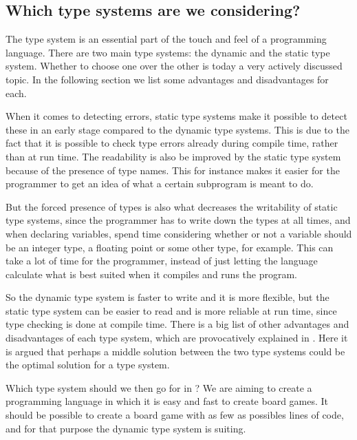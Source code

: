 \subsection{Which type systems are we considering?}
\label{sec:typesystemanalysis}

The type system is an essential part of the touch and feel of a programming
language. There are two main type systems: the dynamic and the static
type system. Whether to choose one over the other is today a very
actively discussed topic. In the following section we list some advantages and
disadvantages for each.

When it comes to detecting errors, static type systems make it possible to
detect these in an early stage compared to the dynamic type systems. This is
due to the fact that it is possible to check type errors already during
compile time, rather than at run time. The readability is also be improved by
the static type system because of the presence of type names. This for instance
makes it easier for the programmer to get an idea of what a certain
subprogram is meant to do.

But the forced presence of types is also what decreases the writability of static
type systems, since the programmer has to write down the types at all times, and
when declaring variables, spend time considering whether or not a variable
should be an integer type, a floating point or some other type, for example. This can take
a lot of time for the programmer, instead of just letting the language calculate 
what is best suited when it compiles and runs the program.

So the dynamic type system is faster to write and it is more flexible, but the
static type system can be easier to read and is more reliable at run time, since type
checking is done at compile time. There is a big list of other advantages and
disadvantages of each type system, which are provocatively explained in
\cite{staticvsdynamictypesystem}. Here it is argued that perhaps a middle
solution between the two type systems could be the optimal solution for a type
system.

Which type system should we then go for in \productname{}? We are aiming to create a
programming language in which it is easy and fast to create board games. It
should be possible to create a board game with as few as possibles lines of code,
and for that purpose the dynamic type system is suiting.
